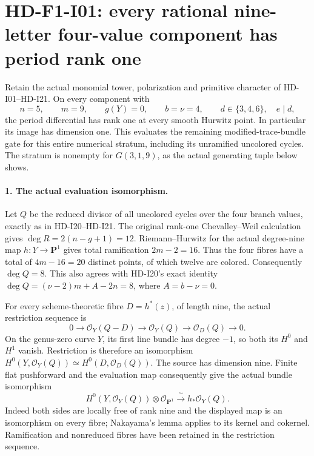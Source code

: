 \section[HD-F1-I01: the nine-letter four-value rank]{HD-F1-I01: every rational nine-letter four-value component has period rank one}
\label{sec:f1-nine-letter-four-value-rank}

Retain the actual monomial tower, polarization and primitive
character of HD-I01--HD-I21. On every component with
\[
 n=5,\qquad m=9,\qquad g(Y)=0,\qquad b=\nu=4,
 \qquad d\in\{3,4,6\},\quad e\mid d,
\]
the period differential has rank one at every smooth Hurwitz
point. In particular its image has dimension one. This
evaluates the remaining modified-trace-bundle gate for this
entire numerical stratum, including its unramified uncolored
cycles. The stratum is nonempty for $G(3,1,9)$, as the actual
generating tuple below shows.

\paragraph{1. The actual evaluation isomorphism.}
Let $Q$ be the reduced divisor of all uncolored cycles over
the four branch values, exactly as in HD-I20--HD-I21.
The original rank-one Chevalley--Weil calculation gives
$\deg R=2(n-g+1)=12$. Riemann--Hurwitz for the actual
degree-nine map $h:Y\to\mathbf P^1$ gives total
ramification $2m-2=16$. Thus the four fibres have a total
of $4m-16=20$ distinct points, of which twelve are colored.
Consequently $\deg Q=8$. This also agrees with
HD-I20's exact identity
$\deg Q=(\nu-2)m+A-2n=8$, where $A=b-\nu=0$.

For every scheme-theoretic fibre $D=h^*(z)$, of length nine,
the actual restriction sequence is
\[
 0\longrightarrow\mathcal O_Y(Q-D)
  \longrightarrow\mathcal O_Y(Q)
  \longrightarrow\mathcal O_D(Q)\longrightarrow0.
\]
On the genus-zero curve $Y$, its first line bundle has
degree $-1$, so both its $H^0$ and $H^1$ vanish. Restriction
is therefore an isomorphism
$H^0(Y,\mathcal O_Y(Q))\simeq H^0(D,\mathcal O_D(Q))$.
The source has dimension nine. Finite flat pushforward and
the evaluation map consequently give the actual bundle
isomorphism
\[
 H^0(Y,\mathcal O_Y(Q))\otimes\mathcal O_{\mathbf P^1}
       \xrightarrow{\ \sim\ }h_*\mathcal O_Y(Q).
\]
Indeed both sides are locally free of rank nine and the
displayed map is an isomorphism on every fibre; Nakayama's
lemma applies to its kernel and cokernel. Ramification and
nonreduced fibres have been retained in the restriction
sequence.

